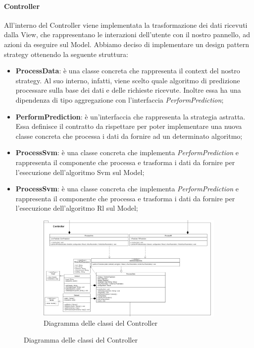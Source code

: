 \paragraph{Controller} \mbox{}
All'interno del Controller viene implementata la trasformazione dei dati ricevuti dalla View, che rappresentano le interazioni dell'utente con il nostro pannello, ad azioni da eseguire sul Model.
Abbiamo deciso di implementare un design pattern strategy ottenendo la seguente struttura:
\begin{itemize}
	\item \textbf{ProcessData}: è una classe concreta che rappresenta il context del nostro strategy. Al suo interno, infatti, viene scelto quale algoritmo di predizione processare sulla base dei dati e delle richieste ricevute. Inoltre essa ha una dipendenza di tipo aggregazione con l'interfaccia \textit{PerformPrediction};
	\item \textbf{PerformPrediction}: è un'interfaccia che rappresenta la strategia astratta. Essa definisce il contratto da rispettare per poter implementare una nuova classe concreta che processa i dati da fornire ad un determinato algoritmo;
	\item \textbf{ProcessSvm}: è una classe concreta che implementa \textit{PerformPrediction} e rappresenta il componente che processa e trasforma i dati da fornire per l'esecuzione dell'algoritmo Svm sul Model;
	\item \textbf{ProcessSvm}: è una classe concreta che implementa \textit{PerformPrediction} e rappresenta il componente che processa e trasforma i dati da fornire per l'esecuzione dell'algoritmo Rl sul Model;
\end{itemize}
\mbox{}
\begin{landscape}
	\begin{figure}
		\begin{figure} [H]
			\includegraphics[width=\linewidth]{./img/Diagrammi/controller-plug-in.png}
			\caption{Diagramma delle classi del Controller}
		\end{figure}
	\end{figure}
\end{landscape}
